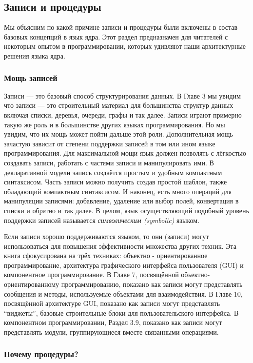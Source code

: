 \subsection{Записи и процедуры}

Мы объясним по какой причине записи и процедуры были включены в состав базовых концепций в язык ядра. Этот раздел предназначен для читателей с некоторым опытом в программировании, которых удивляют наши архитектурные решения языка ядра.

\subsubsection{Мощь записей}

Записи --- это базовый способ структурирования данных. В Главе 3 мы увидим что записи --- это строительный материал для большинства структур данных включая списки, деревья, очереди, графы и так далее. Записи играют примерно такую же роль и в большинстве других языках программирования. Но мы увидим, что их мощь может пойти дальше этой роли. Дополнительная мощь зачастую зависит от степени поддержки записей в том или ином языке программирования. Для максимальной мощи язык должен позволять с лёгкостью создавать записи, работать с частями записи и манипулировать ими. В декларативной модели запись создаётся простым и удобным компактным синтаксисом. Часть записи можно получить создав простой шаблон, также обладающий компактным синтаксисом. И наконец, есть много операций для манипуляции записями: добавление, удаление или выбор полей, конвертация в списки и обратно и так далее. В целом, язык осуществляющий подобный уровень поддержки записей называется \emph{символическим (symbolic)} языком.

Если записи хорошо поддерживаются языком, то они (записи) могут использоваться для повышения эффективности множества других техник. Эта книга сфокусирована на трёх техниках: объектно - ориентированное программирование, архитектура графического интерфейса пользователя (GUI) и компонентное программирование. В Главе 7, посвящённой объектно-ориентированному программированию, показано как записи могут представлять сообщения и методы, используемые объектами для взаимодействия. В Главе 10, посвящённой архитектуре GUI, показано как записи могут представлять ``виджеты'', базовые строительные блоки для пользовательского интерфейса. В компонентном программировании, Раздел 3.9, показано как записи могут представлять модули, группирующиеся вместе связанными операциями.

\subsubsection{Почему процедуры?}

